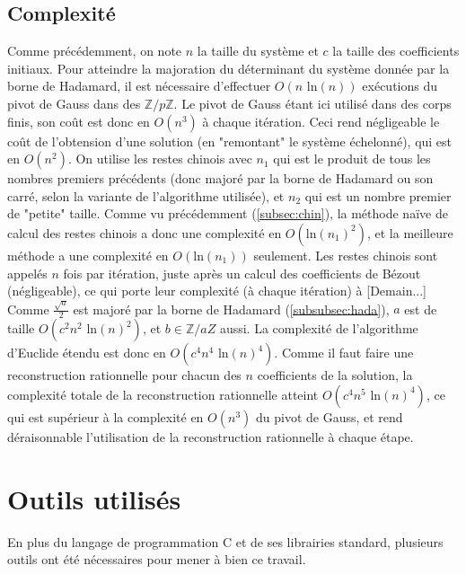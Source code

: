 \documentclass[french]{article}
\begin{document}
\subsection{Complexité} \label{subsec:modcomplx}
Comme précédemment, on note $n$ la taille du système et $c$ la taille des coefficients initiaux.
Pour atteindre la majoration du déterminant du système donnée par la borne de Hadamard, il est nécessaire d'effectuer $O(n \mbox{ ln}(n))$ exécutions du pivot de Gauss dans des $\mathbb{Z}/p\mathbb{Z}$.
\newline
Le pivot de Gauss étant ici utilisé dans des corps finis, son coût est donc en $O(n^3)$ à chaque itération. Ceci rend négligeable le coût de l'obtension d'une solution (en "remontant" le système échelonné), qui est en $O(n^2)$.
On utilise les restes chinois avec $n_1$ qui est le produit de tous les nombres premiers précédents (donc majoré par la borne de Hadamard ou son carré, selon la variante de l'algorithme utilisée), et $n_2$ qui est un nombre premier de "petite" taille.
Comme vu précédemment (\ref{subsec:chin}), la méthode naïve de calcul des restes chinois a donc une complexité en $O(\mbox{ln}(n_1)^2)$, et la meilleure méthode a une complexité en $O(\mbox{ln}(n_1))$ seulement. Les restes chinois sont appelés $n$ fois par itération, juste après un calcul des coefficients de Bézout (négligeable), ce qui porte leur complexité (à chaque itération) à [Demain...]
Comme $\frac{\sqrt{a}}{2}$ est majoré par la borne de Hadamard (\ref{subsubsec:hada}), $a$ est de taille $O(c^2n^2\mbox{ ln}(n)^2)$, et $b \in \mathbb{Z}/a{Z}$ aussi. La complexité de l'algorithme d'Euclide étendu est donc en $O(c^4n^4\mbox{ ln}(n)^4)$. Comme il faut faire une reconstruction rationnelle pour chacun des $n$ coefficients de la solution, la complexité totale de la reconstruction rationnelle atteint $O(c^4n^5\mbox{ ln}(n)^4)$, ce qui est supérieur à la complexité en $O(n^3)$ du pivot de Gauss, et rend déraisonnable l'utilisation de la reconstruction rationnelle à chaque étape.
\newline
[Total]
\section{Outils utilisés} \label{sec:outils}
En plus du langage de programmation C et de ses librairies standard, plusieurs outils ont été nécessaires pour mener à bien ce travail.
\end{document}
